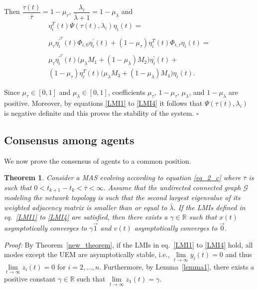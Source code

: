 \documentclass[conference]{IEEEtran}
\newcommand{\rea}{\mathbb{R}}
\newtheorem{theorem}{\textbf{Theorem}}
\begin{document}
Then $\dfrac{\tau(t)}{\bar\tau}=1-\mu_\tau$, $\dfrac{\lambda_i}{\bar\lambda+1}=1-\mu_\lambda$ and
\begin{equation}
\begin{array}{lll}
 \eta^T_i(t)\Psi(\tau(t),\lambda_i)\eta_i(t)= \\~\\ \mu_\tau\eta^{\prime^T}_{i}(t)\Phi_{i,0}\eta^{\prime}_{i}(t)+(1-\mu_\tau)\eta^T_{i}(t)\Phi_{i,\bar{\tau}}\eta_{i}(t)= \\~\\ \mu_\tau\eta^{\prime^T}_{i}(t)\Big(\mu_\lambda M_1+(1-\mu_\lambda)M_2\Big)\eta^{\prime}_{i}(t)+\\
  (1-\mu_\tau)\eta^T_{i}(t)\Big(\mu_\lambda M_3+(1-\mu_\lambda)M_4\Big)\eta_{i}(t).
\end{array}
\end{equation}

Since $\mu_\tau\in [0,1]$  and $\mu_\lambda\in [0,1]$, coefficients $\mu_\tau$, $1-\mu_\tau$, $\mu_\lambda$, and $1-\mu_\lambda$ are positive. Moreover, by equations \eqref{LMI1} to \eqref{LMI4} it follows that $\Psi(\tau(t),\lambda_i)$ is negative definite and this proves the stability of the system. \hfill $\square$






\subsection{Consensus among agents}

We now prove the consensus of agents to a common position.

\begin{theorem}
Consider a MAS evolving according to equation \eqref{eq_2_c} where $\bar \tau$ is such that $0<t_{k+1}-t_k<\bar \tau<\infty$. Assume that the undirected connected graph $\mathcal{G}$ modeling the network topology is such that the second largest eigenvalue of its weighted adjacency matrix is smaller than or equal to $\bar \lambda$. If the LMIs defined in eq.~\eqref{LMI1} to \eqref{LMI4} are satisfied, then there exists a $\gamma \in \rea$ such that $x(t)$ asymptotically converges to $\gamma \vec{1}$ and $v(t)$ asymptotically converges to $\vec{0}$.
\end{theorem}

{\em Proof:} By Theorem~\ref{new_theorem}, if the LMIs in eq.~\eqref{LMI1} to \eqref{LMI4} hold, all modes except the UEM are asymptotically stable, i.e., $\lim\limits_{t\to \infty}y_i(t)=0$ and thus $ \lim\limits_{t\to \infty}z_i(t)=0$ for $i=2,\ldots,n$. Furthermore, by Lemma~\ref{lemma1}, there exists a positive constant $\gamma \in \rea$ such that $\lim\limits_{t\to \infty}z_1(t)=\gamma$.
\end{document}
